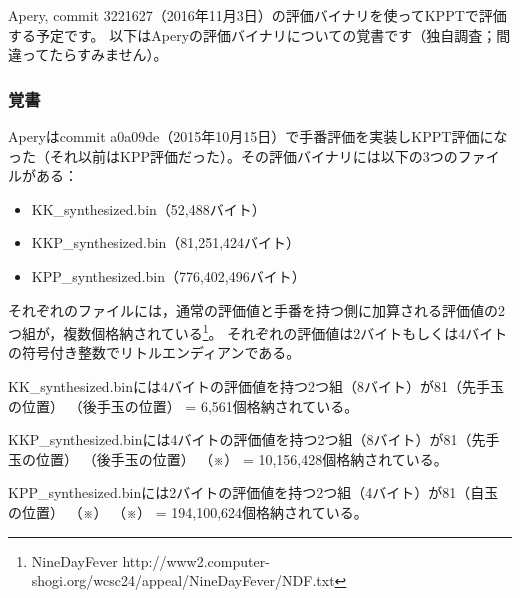 \documentclass[10pt,a4paper]{ltjsarticle}
\begin{document}
Apery, commit 3221627（2016年11月3日）の評価バイナリを使ってKPPTで評価する予定です。
以下はAperyの評価バイナリについての覚書です（独自調査；間違ってたらすみません）。

\subsubsection*{覚書}
Aperyはcommit a0a09de（2015年10月15日）で手番評価を実装しKPPT評価になった（それ以前はKPP評価だった）。その評価バイナリには以下の3つのファイルがある：

\begin{itemize}
  \item KK\_synthesized.bin（52,488バイト）
  \item KKP\_synthesized.bin（81,251,424バイト）
  \item KPP\_synthesized.bin（776,402,496バイト）
\end{itemize}

それぞれのファイルには，通常の評価値と手番を持つ側に加算される評価値の2つ組が，複数個格納されている\footnote{NineDayFever http://www2.computer-shogi.org/wcsc24/appeal/NineDayFever/NDF.txt}。
それぞれの評価値は2バイトもしくは4バイトの符号付き整数でリトルエンディアンである。

KK\_synthesized.binには4バイトの評価値を持つ2つ組（8バイト）が81（先手玉の位置） （後手玉の位置） = 6,561個格納されている。

KKP\_synthesized.binには4バイトの評価値を持つ2つ組（8バイト）が81（先手玉の位置） （後手玉の位置） （※） = 10,156,428個格納されている。

KPP\_synthesized.binには2バイトの評価値を持つ2つ組（4バイト）が81（自玉の位置） （※） （※） = 194,100,624個格納されている。\\
\end{document}
